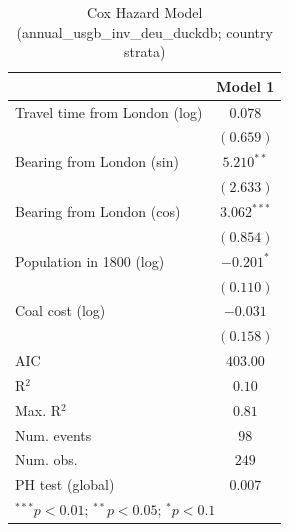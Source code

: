 
\begin{table}
\begin{center}
\begin{tabular}{l c}
\hline
 & Model 1 \\
\hline
Travel time from London (log) & $0.078$ \\
 & $(0.659)$ \\
Bearing from London (sin) & $5.210^{**}$ \\
 & $(2.633)$ \\
Bearing from London (cos) & $3.062^{***}$ \\
 & $(0.854)$ \\
Population in 1800 (log) & $-0.201^{*}$ \\
 & $(0.110)$ \\
Coal cost (log) & $-0.031$ \\
 & $(0.158)$ \\
\hline
AIC              & $403.00$ \\
R$^2$            & $0.10$ \\
Max. R$^2$       & $0.81$ \\
Num. events      & $98$ \\
Num. obs.        & $249$ \\
PH test (global) & $0.007$ \\
\hline
\multicolumn{2}{l}{\scriptsize{$^{***}p<0.01$; $^{**}p<0.05$; $^{*}p<0.1$}}
\end{tabular}
\caption{Cox Hazard Model (annual\_usgb\_inv\_deu\_duckdb; country strata)}
\label{tab:cox_serious_strata_annual_usgb_inv_deu_duckdb}
\end{center}
\end{table}

